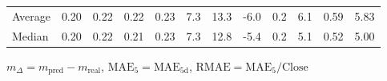 \begin{threeparttable}
{\begin{tabular}{lrrrrrrrrrrr}
Average &          0.20 &          0.22 &          0.22 &        0.23 &                 7.3 &                13.3 &       -6.0 &                 0.2 &              6.1 &            0.59 &                   5.83 \\
 Median &          0.20 &          0.22 &          0.21 &        0.23 &                 7.3 &                12.8 &       -5.4 &                 0.2 &              5.1 &            0.52 &                   5.00 \\
\bottomrule
\end{tabular}
}
\begin{tablenotes}\footnotesize
\item $m_\Delta=m_{\text{pred}}-m_{\text{real}}$,
$\mathrm{MAE}_5=\mathrm{MAE}_{5\text{d}}$,
$\mathrm{RMAE}=\mathrm{MAE}_5/\text{Close}$
\end{tablenotes}
\end{threeparttable}
\endgroup

